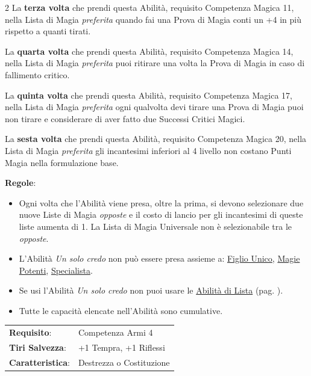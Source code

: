 \begin{multicols}{2}
La \textbf{terza volta} che prendi questa Abilità, requisito Competenza Magica 11, nella Lista di Magia \emph{preferita} quando fai una Prova di Magia conti un +4 in più rispetto a quanti tirati.

La \textbf{quarta volta} che prendi questa Abilità, requisito Competenza Magica 14, nella Lista di Magia \emph{preferita} puoi ritirare una volta la Prova di Magia in caso di fallimento critico.

La \textbf{quinta volta} che prendi questa Abilità, requisito Competenza Magica 17, nella Lista di Magia \emph{preferita} ogni qualvolta devi tirare una Prova di Magia puoi non tirare e considerare di aver fatto due Successi Critici Magici.

La \textbf{sesta volta} che prendi questa Abilità, requisito Competenza Magica 20, nella Lista di Magia \emph{preferita} gli incantesimi inferiori al 4 livello non costano Punti Magia nella formulazione base.

\medskip

\textbf{Regole}:

\smallskip

\begin{itemize}[leftmargin=*] \setlength{\itemsep}{0pt}
\item Ogni volta che l'Abilità viene presa, oltre la prima, si devono selezionare due nuove Liste di Magia \emph{opposte} e il costo di lancio per gli incantesimi di queste liste aumenta di 1. La Lista di Magia Universale non è selezionabile tra le \emph{opposte}.

\item L'Abilità \emph{Un solo credo} non può essere presa assieme a: \hyperlink{Figlio Unico}{Figlio Unico}, \hyperlink{Magie Potenti}{Magie Potenti}, \hyperlink{Specialista}{Specialista}.

\item Se usi l'Abilità \emph{Un solo credo} non puoi usare le \hyperlink{abilitadilista}{Abilità di Lista} (pag. \pageref{abilitadilista}).

\item Tutte le capacità elencate nell'Abilità sono cumulative.
\end{itemize}

\hspace{-0.2cm}\begin{tabularx}{\linewidth}{l@{\hspace{8pt}}X}
\rowcolor{gray!20}\textbf{Requisito}: & Competenza Armi 4\\
\textbf{Tiri Salvezza}: & +1 Tempra, +1 Riflessi\\
\rowcolor{gray!20}\textbf{Caratteristica}: & Destrezza o Costituzione\\
\end{tabularx}\smallskip


\end{multicols}

